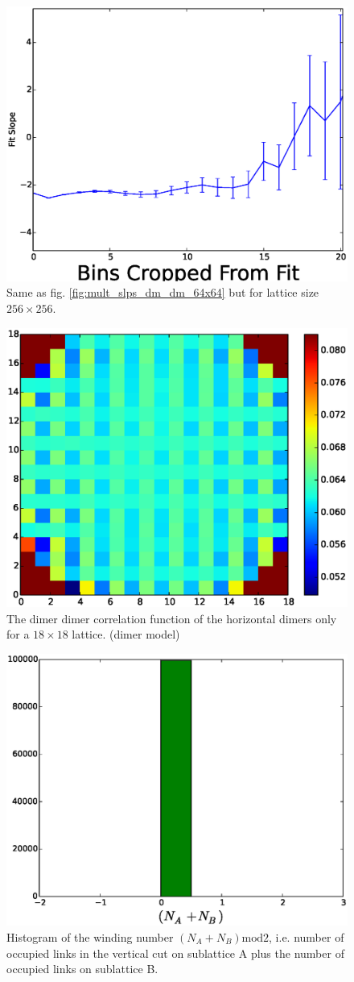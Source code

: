 \documentclass[aps,floatfix,11pt]{revtex4-1}
\begin{document}
\begin{figure}[h]
    \centering
    \includegraphics[width=8.5 cm]{multi_slps_dm_dm_256x256}
    \caption{Same as fig. \ref{fig:mult_slps_dm_dm_64x64} but for lattice size $256\times 256$.
    \label{fig:mult_slps_dm_dm_256x256}}
\end{figure}

\begin{figure}[h]
    \centering
    \includegraphics[width=8.5 cm]{full_lat_dmr_dmr_cor_dmr_dmr_mdl}
    \caption{The dimer dimer correlation function of the horizontal dimers only for a $18\times18$
    lattice. (dimer model)\label{}}
\end{figure}

\begin{figure}[h]
    \centering
    \includegraphics[width=8.5 cm]{W_vrt_NApNB_dmr_dmr_mdl}
    \caption{Histogram of the winding number $(N_A + N_B)\mathrm{mod}2$, i.e. number of occupied links in the
    vertical cut on sublattice A plus the number of occupied links on sublattice B.\label{}}
\end{figure}
\end{document}
